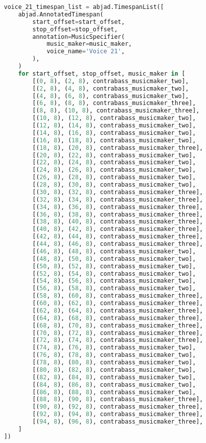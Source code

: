 \begin{lstlisting}[language=Python, caption=Invocation Source Code]
voice_21_timespan_list = abjad.TimespanList([
    abjad.AnnotatedTimespan(
        start_offset=start_offset,
        stop_offset=stop_offset,
        annotation=MusicSpecifier(
            music_maker=music_maker,
            voice_name='Voice 21',
        ),
    )
    for start_offset, stop_offset, music_maker in [
        [(0, 8), (2, 8), contrabass_musicmaker_two],
        [(2, 8), (4, 8), contrabass_musicmaker_two],
        [(4, 8), (6, 8), contrabass_musicmaker_two],
        [(6, 8), (8, 8), contrabass_musicmaker_three],
        [(8, 8), (10, 8), contrabass_musicmaker_three],
        [(10, 8), (12, 8), contrabass_musicmaker_two],
        [(12, 8), (14, 8), contrabass_musicmaker_two],
        [(14, 8), (16, 8), contrabass_musicmaker_two],
        [(16, 8), (18, 8), contrabass_musicmaker_two],
        [(18, 8), (20, 8), contrabass_musicmaker_three],
        [(20, 8), (22, 8), contrabass_musicmaker_two],
        [(22, 8), (24, 8), contrabass_musicmaker_two],
        [(24, 8), (26, 8), contrabass_musicmaker_two],
        [(26, 8), (28, 8), contrabass_musicmaker_two],
        [(28, 8), (30, 8), contrabass_musicmaker_two],
        [(30, 8), (32, 8), contrabass_musicmaker_three],
        [(32, 8), (34, 8), contrabass_musicmaker_three],
        [(34, 8), (36, 8), contrabass_musicmaker_three],
        [(36, 8), (38, 8), contrabass_musicmaker_three],
        [(38, 8), (40, 8), contrabass_musicmaker_three],
        [(40, 8), (42, 8), contrabass_musicmaker_three],
        [(42, 8), (44, 8), contrabass_musicmaker_three],
        [(44, 8), (46, 8), contrabass_musicmaker_three],
        [(46, 8), (48, 8), contrabass_musicmaker_two],
        [(48, 8), (50, 8), contrabass_musicmaker_two],
        [(50, 8), (52, 8), contrabass_musicmaker_two],
        [(52, 8), (54, 8), contrabass_musicmaker_two],
        [(54, 8), (56, 8), contrabass_musicmaker_two],
        [(56, 8), (58, 8), contrabass_musicmaker_two],
        [(58, 8), (60, 8), contrabass_musicmaker_three],
        [(60, 8), (62, 8), contrabass_musicmaker_three],
        [(62, 8), (64, 8), contrabass_musicmaker_three],
        [(64, 8), (68, 8), contrabass_musicmaker_three],
        [(68, 8), (70, 8), contrabass_musicmaker_three],
        [(70, 8), (72, 8), contrabass_musicmaker_three],
        [(72, 8), (74, 8), contrabass_musicmaker_three],
        [(74, 8), (76, 8), contrabass_musicmaker_two],
        [(76, 8), (78, 8), contrabass_musicmaker_two],
        [(78, 8), (80, 8), contrabass_musicmaker_two],
        [(80, 8), (82, 8), contrabass_musicmaker_two],
        [(82, 8), (84, 8), contrabass_musicmaker_two],
        [(84, 8), (86, 8), contrabass_musicmaker_two],
        [(86, 8), (88, 8), contrabass_musicmaker_two],
        [(88, 8), (90, 8), contrabass_musicmaker_three],
        [(90, 8), (92, 8), contrabass_musicmaker_three],
        [(92, 8), (94, 8), contrabass_musicmaker_three],
        [(94, 8), (96, 8), contrabass_musicmaker_three],
    ]
])


\end{lstlisting}
